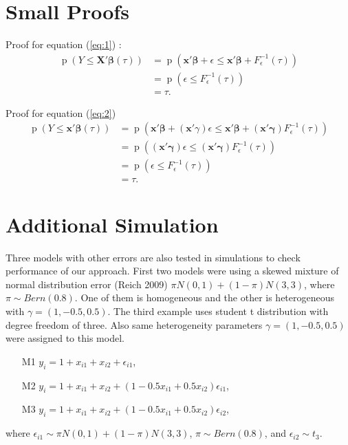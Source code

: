 \documentclass[12pt]{article}
\DeclareMathOperator{\pr}{p}
\begin{document}

% 


\appendix 
\section{Small Proofs}

Proof for equation (\ref{eq:1}) : 
\begin{align*}
  \pr (Y \le \bm{X'\beta}(\tau)) & = \pr \left( \bm{x'\beta} + \epsilon
    \le \bm{x'\beta} + F^{-1}_{\epsilon}(\tau) \right) \\
  & = \pr (\epsilon \le F^{-1}_{\epsilon}(\tau)) \\
  & = \tau. 
\end{align*}

Proof for equation (\ref{eq:2})
\begin{align*}
  \pr (Y \le \bm{x'\beta}(\tau)) & = \pr \left( \bm{x'\beta} +
    (\bm{x}'\gamma) \epsilon \le \bm{x'\beta} + (\bm{x'\gamma})
    F^{-1}_{\epsilon}(\tau) \right) \\
  & = \pr \left( (\bm{x'\gamma}) \epsilon \le  (\bm{x'\gamma})
    F^{-1}_{\epsilon}(\tau)  \right)\\
  & = \pr (\epsilon \le F^{-1}_{\epsilon}(\tau)) \\
  & = \tau .
\end{align*}

\section{Additional Simulation}

Three models with other errors are also tested in simulations to check
performance of our approach. First two models were using a skewed
mixture of normal distribution error (Reich 2009) $\pi N(0,1) +
(1-\pi) N(3,3)$, where $\pi \sim Bern(0.8)$. One of them is
homogeneous  and the other is heterogeneous with $\gamma=(1,
-0.5,0.5)$. The third example uses student t distribution with degree
freedom of three. Also same heterogeneity parameters $\gamma=(1,
-0.5,0.5)$ were assigned to this model. 

\begin{itemize}
\item [M1] $y_i = 1+x_{i1} + x_{i2} + \epsilon_{i1}$,
\item [M2] $y_i = 1+x_{i1} + x_{i2} + (1 -0.5x_{i1} +
  0.5x_{i2})\epsilon_{i1}$,
\item [M3] $y_i = 1+x_{i1} + x_{i2} + (1 -0.5x_{i1} +
  0.5x_{i2})\epsilon_{i2}$,
\end{itemize}
where $\epsilon_{i1} \sim \pi N(0,1) +
(1-\pi) N(3,3)$,  $\pi \sim Bern(0.8)$, and $\epsilon_{i2} \sim t_3$. 
\end{document}

